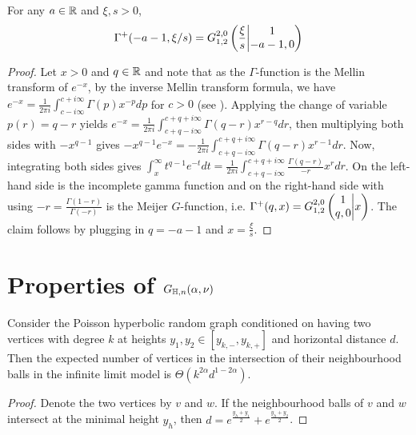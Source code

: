 \begin{appendices}
\begin{lemma}
For any $a\in \R$ and $\xi, s>0$,
$$\Gamma^+(-a-1,\xi/s) = \MeijerGnew{2}{0}{1}{2}{1}{-a-1,0}{\frac{\xi}{s}}$$
\end{lemma}
\begin{proof}
Let $x>0$ and $q\in\R$ and note that as the $\Gamma$-function is the Mellin transform of $e^{-x}$, by the inverse Mellin transform formula, we have $e^{-x}=\frac{1}{2\pi i}\int_{c-i\infty}^{c+i\infty} \Gamma(p)x^{-p}dp$ for $c>0$ (see \cite[p.196]{davies2012integral}). Applying the change of variable $p(r)=q-r$ yields $e^{-x}=\frac{1}{2\pi i}\int_{c+q-i\infty}^{c+q+i\infty} \Gamma(q-r) x^{r-q}dr$, then multiplying both sides with $-x^{q-1}$ gives $-x^{q-1}e^{-x} = -\frac{1}{2\pi i}\int_{c+q-i\infty}^{c+q+i\infty} \Gamma(q-r) x^{r-1}dr$. Now, integrating both sides gives $\int_x^\infty t^{q-1}e^{-t}dt = \frac{1}{2\pi i}\int_{c+q-i\infty}^{c+q+i\infty}\frac{\Gamma(q-r)}{-r}x^r dr$. On the left-hand side is the incomplete gamma function and on the right-hand side with using $-r= \frac{\Gamma(1-r)}{\Gamma(-r)}$ is the Meijer $G$-function, i.e. $\Gamma^+(q,x)=\MeijerG{2}{0}{1}{2}{1}{q,0}{x}$. The claim follows by plugging in $q=-a-1$ and $x=\frac{\xi}{s}$.
\end{proof}

\section*{Properties of $G_{\H,n}(\alpha,\nu)$}


\begin{lemma}\label{lem:mu3}
Consider the Poisson hyperbolic random graph conditioned on having two vertices with degree $k$ at heights $y_1, y_2 \in [y_{k,-},y_{k,+}]$ and horizontal distance $d$. Then the expected number of vertices in the intersection of their neighbourhood balls in the infinite limit model is $\Theta(k^{2\alpha}d^{1-2\alpha})$.
\end{lemma}
\begin{proof}
Denote the two vertices by $v$ and $w$.
If the neighbourhood balls of $v$ and $w$ intersect at the minimal height $y_h$, then $d = e^{\frac{y_h+y_1}{2}}+e^{\frac{y_h+y_2}{2}}$.


\end{proof}
\end{appendices}
